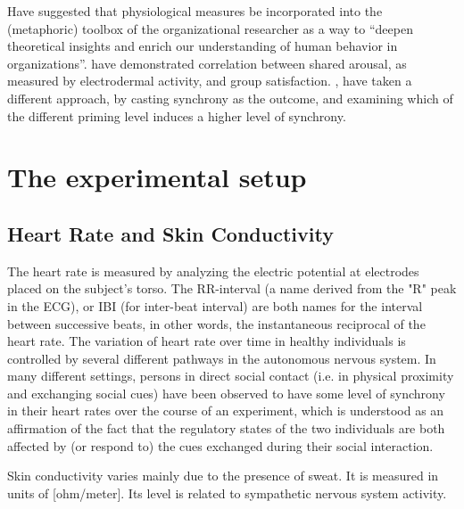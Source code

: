 \documentclass[a4paper, 11pt]{article}      %
\begin{document}
\cite{akinola2010measuring} Have suggested that physiological measures be incorporated into the (metaphoric) toolbox of the organizational researcher as a way to \enquote{deepen theoretical insights and enrich our understanding of human behavior in organizations}. \cite{chikersal2017deep} have demonstrated correlation between shared arousal, as measured by electrodermal activity, and group satisfaction. \cite{danyluck2018intergroup}, have taken a different approach, by casting synchrony as the outcome, and examining which of the different priming level induces a higher level of synchrony. 

\section{The experimental setup}

\subsection{Heart Rate and Skin Conductivity}
The heart rate is measured by analyzing the electric potential at electrodes placed on the subject's torso. The RR-interval (a name derived from the "R" peak in the ECG), or IBI (for inter-beat interval) are both names for the interval between successive beats, in other words, the instantaneous reciprocal of the heart rate. The variation of heart rate over time in healthy individuals is controlled by several different pathways in the autonomous nervous system. In many different settings, persons in direct social contact (i.e. in physical proximity and exchanging social cues) have been observed to have some level of synchrony in their heart rates over the course of an experiment, which is understood as an affirmation of the fact that the regulatory states of the two individuals are both affected by (or respond to) the cues exchanged during their social interaction.

Skin conductivity varies mainly due to the presence of sweat. It is measured in units of [ohm\slash meter]. Its level is related to sympathetic nervous system activity.
\end{document}
